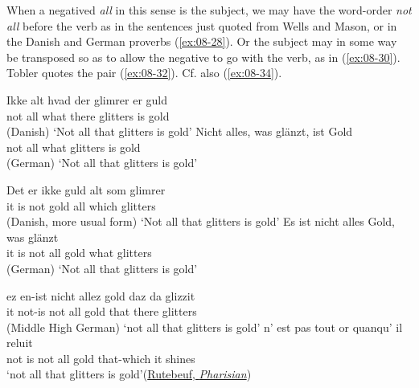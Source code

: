 When a negatived \textit{all} in this sense is the subject, we may have the word-order \textit{not all} before the verb as in the sentences just quoted from Wells and Mason, or in the Danish and German proverbs (\ref{ex:08-28}). Or the subject may in some way be transposed so as to allow the negative to go with the verb, as in (\ref{ex:08-30}). Tobler %
{quotes} the pair (\ref{ex:08-32}). %
Cf. also (\ref{ex:08-34}).

\ea \label{ex:08-28}
\ea {}
\gll Ikke alt hvad der glimrer er guld\\
 not all what there glitters is gold\\\hfill(Danish)
\glt `Not all that glitters is gold'
\ex
\gll Nicht alles, was glänzt, ist Gold\\
 not all what glitters is gold\\\hfill(German)
\glt `Not all that glitters is gold'
\z
\z

\ea \label{ex:08-30}
\ea{}
\gll Det er ikke guld alt som glimrer\\
 it is not gold all which glitters\\\hfill(Danish, more usual form)
\glt `Not all that glitters is gold'
\ex
\gll Es ist nicht alles Gold, was glänzt\\
 it is not all gold what glitters\\\hfill(German)
\glt `Not all that glitters is gold'
\z
\z

\ea \label{ex:08-32}
\ea
\gll ez en-ist nicht allez gold daz da glizzit\\
 it not-is not all gold that there glitters\\\hfill(Middle High German)
\glt `not all that glitters is gold' %
\ex
\gll n' est pas tout or quanqu' il reluit\\
 not is not all gold that-which it shines\\
\glt `not all that glitters is gold'\hfill(\href{https://archive.org/details/oeuvrescompltes01rute/page/246/mode/2up?q=reluit&view=theater}{Rutebeuf, \textit{Pharisian}})
\z
\z

